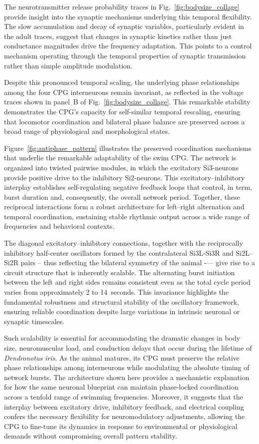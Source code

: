 \documentclass[nofootinbib,aip,amsmath,amssymb,reprint,twocolumn,10pt]{revtex4-2}
\begin{document}
The neurotransmitter release probability traces in Fig.~\ref{fig:bodysize_collage} provide insight into the synaptic mechanisms underlying this temporal flexibility. The slow accumulation and decay of synaptic variables, particularly evident in the adult traces, suggest that changes in synaptic kinetics rather than just conductance magnitudes drive the frequency adaptation. This points to a control mechanism operating through the temporal properties of synaptic transmission rather than simple amplitude modulation.

 Despite this pronounced temporal scaling, the underlying phase relationships among the four CPG interneurons remain invariant, as reflected in the voltage traces shown in panel~B of Fig.~\ref{fig:bodysize_collage}. This remarkable stability demonstrates the CPG's capacity for self-similar temporal rescaling, ensuring that locomotor coordination and bilateral phase balance are preserved across a broad range of physiological and morphological states. 
 
Figure~\ref{fig:antiphase_pattern} illustrates the preserved coordination mechanisms that underlie the remarkable adaptability of the swim CPG. The network is organized into twisted pairwise modules, in which the excitatory Si3-neurons provide positive drive to the inhibitory Si2-neurons. This excitatory–inhibitory interplay establishes self-regulating negative feedback loops that control, in term, burst duration and, consequently, the overall network period. Together, these reciprocal interactions form a robust architecture for left–right alternation and temporal coordination, sustaining stable rhythmic output across a wide range of frequencies and behavioral contexts.

The diagonal excitatory–inhibitory connections, together with the reciprocally inhibitory half-center oscillators formed by the contralateral Si3L-Si3R and Si2L--Si2R pairs -- thus reflecting the bilateral symmetry of the animal -— give rise to a circuit structure that is inherently scalable. The alternating burst initiation between the left and right sides remains consistent even as the total cycle period varies from approximately 2 to 14~seconds. This invariance highlights the fundamental robustness and structural stability of the oscillatory framework, ensuring reliable coordination despite large variations in intrinsic neuronal or synaptic timescales.

Such scalability is essential for accommodating the dramatic changes in body size, neuromuscular load, and conduction delays that occur during the lifetime of {\em \textit{Dendronotus iris}}. As the animal matures, its CPG must preserve the relative phase relationships among interneurons while modulating the absolute timing of network bursts. The architecture shown here provides a mechanistic explanation for how the same neuronal blueprint can maintain phase-locked coordination across a tenfold range of swimming frequencies. Moreover, it suggests that the interplay between excitatory drive, inhibitory feedback, and electrical coupling confers the necessary flexibility for neuromodulatory adjustments, allowing the CPG to fine-tune its dynamics in response to environmental or physiological demands without compromising overall pattern stability.
\end{document}
